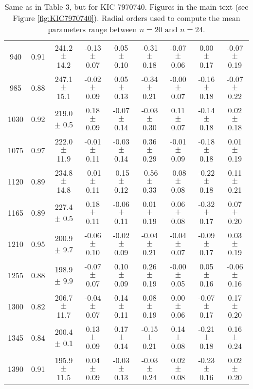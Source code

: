 \documentclass[twocolumn]{aastex61}%
\begin{document}
\begin{table*}[ht]
\begin{tabular}{ccc|ccccc|c}
940 & 0.91 & 241.2 $\pm$ 14.2 & -0.13 $\pm$ 0.07 & 0.05 $\pm$ 0.10 & -0.31 $\pm$ 0.18 & -0.07 $\pm$ 0.06 & 0.00 $\pm$ 0.17 & -0.07 $\pm$ 0.19\\
985 & 0.88 & 247.1 $\pm$ 15.1 & -0.02 $\pm$ 0.09 & 0.05 $\pm$ 0.13 & -0.34 $\pm$ 0.21 & -0.00 $\pm$ 0.07 & -0.16 $\pm$ 0.18 & -0.07 $\pm$ 0.22\\
1030 & 0.92 & 219.0 $\pm$ 0.5 & 0.18 $\pm$ 0.09 & -0.07 $\pm$ 0.14 & -0.03 $\pm$ 0.30 & 0.11 $\pm$ 0.07 & -0.14 $\pm$ 0.18 & 0.02 $\pm$ 0.18\\
1075 & 0.97 & 222.0 $\pm$ 11.9 & -0.01 $\pm$ 0.11 & -0.03 $\pm$ 0.14 & 0.36 $\pm$ 0.29 & -0.01 $\pm$ 0.09 & -0.18 $\pm$ 0.18 & 0.01 $\pm$ 0.19\\
1120 & 0.89 & 234.8 $\pm$ 14.8 & -0.01 $\pm$ 0.11 & -0.15 $\pm$ 0.12 & -0.56 $\pm$ 0.33 & -0.08 $\pm$ 0.08 & -0.22 $\pm$ 0.18 & 0.11 $\pm$ 0.21\\
1165 & 0.89 & 227.4 $\pm$ 0.5 & 0.18 $\pm$ 0.11 & -0.06 $\pm$ 0.11 & 0.01 $\pm$ 0.19 & 0.06 $\pm$ 0.08 & -0.32 $\pm$ 0.17 & 0.07 $\pm$ 0.20\\
1210 & 0.95 & 200.9 $\pm$ 9.7 & -0.06 $\pm$ 0.10 & -0.02 $\pm$ 0.09 & -0.04 $\pm$ 0.21 & -0.04 $\pm$ 0.07 & -0.09 $\pm$ 0.17 & 0.03 $\pm$ 0.19\\
1255 & 0.88 & 198.9 $\pm$ 9.9 & -0.07 $\pm$ 0.07 & 0.10 $\pm$ 0.09 & 0.26 $\pm$ 0.19 & -0.00 $\pm$ 0.05 & 0.05 $\pm$ 0.16 & -0.06 $\pm$ 0.16\\
1300 & 0.82 & 206.7 $\pm$ 11.7 & -0.04 $\pm$ 0.07 & 0.14 $\pm$ 0.11 & 0.08 $\pm$ 0.19 & 0.00 $\pm$ 0.06 & -0.07 $\pm$ 0.17 & 0.17 $\pm$ 0.20\\
1345 & 0.84 & 200.4 $\pm$ 0.1 & 0.13 $\pm$ 0.09 & 0.17 $\pm$ 0.14 & -0.15 $\pm$ 0.21 & 0.14 $\pm$ 0.08 & -0.21 $\pm$ 0.18 & 0.16 $\pm$ 0.24\\
1390 & 0.91 & 195.9 $\pm$ 11.5 & 0.04 $\pm$ 0.09 & -0.03 $\pm$ 0.13 & -0.03 $\pm$ 0.24 & 0.02 $\pm$ 0.08 & -0.23 $\pm$ 0.16 & 0.02 $\pm$ 0.20\\
\end{tabular}
\caption{Same as in Table 3, but for KIC 7970740. Figures in the main text (see Figure \ref{fig:KIC7970740}). Radial orders used to compute the mean parameters range between $n=20$ and $n=24$.}\label{tab:7970740}
\end{table*}
\end{document}
